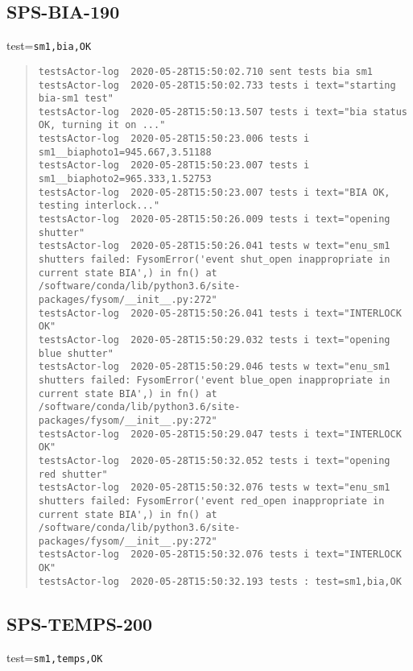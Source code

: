 \subsection{SPS-BIA-190}
\label{sec:tc-190}

test=\texttt{sm1,bia,OK}

\begin{quote}
\begin{tiny}
\begin{verbatim}
testsActor-log  2020-05-28T15:50:02.710 sent tests bia sm1
testsActor-log  2020-05-28T15:50:02.733 tests i text="starting bia-sm1 test"
testsActor-log  2020-05-28T15:50:13.507 tests i text="bia status OK, turning it on ..."
testsActor-log  2020-05-28T15:50:23.006 tests i sm1__biaphoto1=945.667,3.51188
testsActor-log  2020-05-28T15:50:23.007 tests i sm1__biaphoto2=965.333,1.52753
testsActor-log  2020-05-28T15:50:23.007 tests i text="BIA OK, testing interlock..."
testsActor-log  2020-05-28T15:50:26.009 tests i text="opening  shutter"
testsActor-log  2020-05-28T15:50:26.041 tests w text="enu_sm1 shutters failed: FysomError('event shut_open inappropriate in current state BIA',) in fn() at /software/conda/lib/python3.6/site-packages/fysom/__init__.py:272"
testsActor-log  2020-05-28T15:50:26.041 tests i text="INTERLOCK OK"
testsActor-log  2020-05-28T15:50:29.032 tests i text="opening blue shutter"
testsActor-log  2020-05-28T15:50:29.046 tests w text="enu_sm1 shutters failed: FysomError('event blue_open inappropriate in current state BIA',) in fn() at /software/conda/lib/python3.6/site-packages/fysom/__init__.py:272"
testsActor-log  2020-05-28T15:50:29.047 tests i text="INTERLOCK OK"
testsActor-log  2020-05-28T15:50:32.052 tests i text="opening red shutter"
testsActor-log  2020-05-28T15:50:32.076 tests w text="enu_sm1 shutters failed: FysomError('event red_open inappropriate in current state BIA',) in fn() at /software/conda/lib/python3.6/site-packages/fysom/__init__.py:272"
testsActor-log  2020-05-28T15:50:32.076 tests i text="INTERLOCK OK"
testsActor-log  2020-05-28T15:50:32.193 tests : test=sm1,bia,OK
\end{verbatim}
\end{tiny}
\end{quote}

\subsection{SPS-TEMPS-200}
\label{sec:tc-200}

test=\texttt{sm1,temps,OK}

